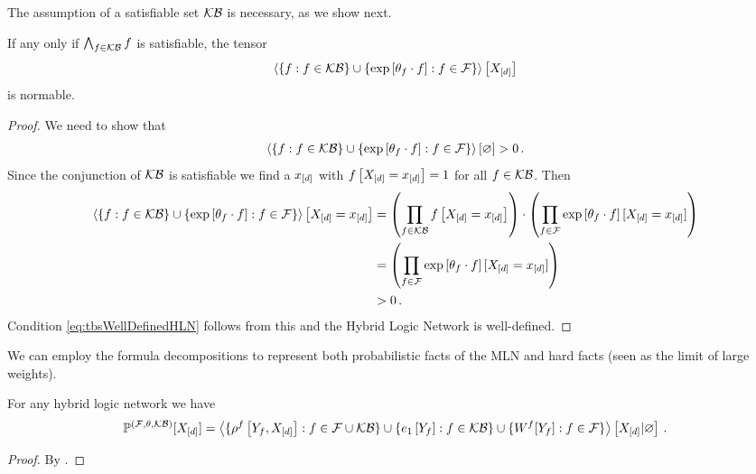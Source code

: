 The assumption of a satisfiable set $\mathcal{KB}$ is necessary, as we show next.

\begin{theorem}
	If any only if $\bigwedge_{f\in\mathcal{KB}}f$ is satisfiable, the tensor 
		\[  \left\langle 
		\{f : f\in\mathcal{KB}\} \cup \{\mathrm{exp}\left[\theta_{f}\cdot f\right] : f\in\mathcal{F}\}
		\right\rangle \left[ X_{[d]} \right] \]
	is normable.
\end{theorem}
\begin{proof}
	We need to show that
	\begin{align}\label{eq:tbsWellDefinedHLN}
		\left\langle \{f : f\in\mathcal{KB}\} \cup \{\mathrm{exp}\left[\theta_{f}\cdot f\right] : f\in\mathcal{F}\}\right\rangle \left[ \varnothing \right] > 0 \, . 
	\end{align}
	Since the conjunction of $\mathcal{KB}$ is satisfiable we find a $x_{[d]}$ with $f\left[X_{[d]}=x_{[d]}\right]=1$ for all $f\in\mathcal{KB}$.
	Then 
	\begin{align*}
		 \left\langle \{f : f\in\mathcal{KB}\} \cup \{\mathrm{exp}\left[\theta_{f}\cdot f\right] : f\in\mathcal{F}\}\right\rangle \left[ X_{[d]}=x_{[d]} \right]  
		 & = \left( \prod_{f\in\mathcal{KB}}f\left[X_{[d]}=x_{[d]}\right] \right) 
		 \cdot \left( \prod_{f\in\mathcal{F}}\mathrm{exp}\left[\theta_{f}\cdot f\right][X_{[d]}=x_{[d]}] \right) \\
		 & =  \left( \prod_{f\in\mathcal{F}}\mathrm{exp}\left[\theta_{f}\cdot f\right][X_{[d]}=x_{[d]}] \right) \\
		 & > 0 \, . 
	\end{align*}
	Condition \eqref{eq:tbsWellDefinedHLN} follows from this and the Hybrid Logic Network is well-defined.
\end{proof}



We can employ the formula decompositions to represent both probabilistic facts of the MLN and hard facts (seen as the limit of large weights).

\begin{theorem}\label{the:hybridNetworkRepresentation}
	For any hybrid logic network we have
	\begin{align*}
		\mathbb{P}^{(\mathcal{F},\theta,\mathcal{KB})}[X_{[d]}] 
		= \left\langle 
		\{\rho^{f}\left[Y_{f},X_{[d]}\right] : f\in\mathcal{F}\cup\mathcal{KB} \}
		\cup \{e_1\left[Y_{f}\right] : f\in\mathcal{KB} \}
		\cup \{W^{f}[Y_{f}] : f\in\mathcal{F} \}
		\right\rangle \left[ X_{[d]} | \varnothing \right] \, . 
	\end{align*}
\end{theorem}
\begin{proof}
	By .
\end{proof}

